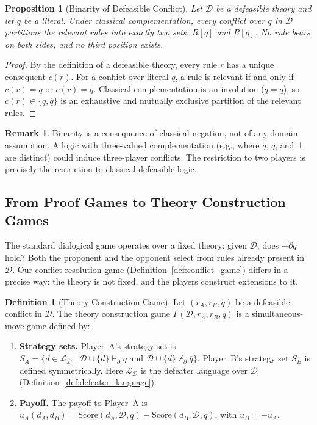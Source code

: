 \documentclass{article}
\newtheorem{proposition}[theorem]{Proposition}
\theoremstyle{definition}
\newtheorem{definition}[theorem]{Definition}
\newtheorem{remark}[theorem]{Remark}
\newcommand{\D}{\mathcal{D}}
\newcommand{\pPartial}{\vdash_{\partial}}
\newcommand{\comp}[1]{\overline{#1}}
\newcommand{\Score}{\mathrm{Score}}
\begin{document}
\begin{proposition}[Binarity of Defeasible Conflict]\label{prop:binarity}
Let $\D$ be a defeasible theory and let $q$ be a literal. Under classical complementation, every conflict over $q$ in $\D$ partitions the relevant rules into exactly two sets: $R[q]$ and $R[\comp{q}]$. No rule bears on both sides, and no third position exists.
\end{proposition}

\begin{proof}
By the definition of a defeasible theory, every rule $r$ has a unique consequent $c(r)$. For a conflict over literal $q$, a rule is relevant if and only if $c(r) = q$ or $c(r) = \comp{q}$. Classical complementation is an involution ($\comp{\comp{q}} = q$), so $c(r) \in \{q, \comp{q}\}$ is an exhaustive and mutually exclusive partition of the relevant rules.
\end{proof}

\begin{remark}\label{rem:binarity}
Binarity is a consequence of classical negation, not of any domain assumption. A logic with three-valued complementation (e.g., where $q$, $\comp{q}$, and $\bot$ are distinct) could induce three-player conflicts. The restriction to two players is precisely the restriction to classical defeasible logic.
\end{remark}

\subsection{From Proof Games to Theory Construction Games}

The standard dialogical game operates over a fixed theory: given $\D$, does $+\partial q$ hold? Both the proponent and the opponent select from rules already present in $\D$. Our conflict resolution game (Definition~\ref{def:conflict_game}) differs in a precise way: the theory is not fixed, and the players construct extensions to it.

\begin{definition}[Theory Construction Game]\label{def:theory_construction_game}
Let $(r_A, r_B, q)$ be a defeasible conflict in $\D$. The theory construction game $\Gamma(\D, r_A, r_B, q)$ is a simultaneous-move game defined by:
\begin{enumerate}[nosep]
    \item \textbf{Strategy sets.} Player~A's strategy set is $S_A = \{d \in \mathcal{L}_\D \mid \D \cup \{d\} \pPartial q \text{ and } \D \cup \{d\} \not\pPartial \comp{q}\}$. Player~B's strategy set $S_B$ is defined symmetrically. Here $\mathcal{L}_\D$ is the defeater language over $\D$ (Definition~\ref{def:defeater_language}).
    \item \textbf{Payoff.} The payoff to Player~A is $u_A(d_A, d_B) = \Score(d_A, \D, q) - \Score(d_B, \D, \comp{q})$, with $u_B = -u_A$.
\end{enumerate}
\end{definition}
\end{document}
